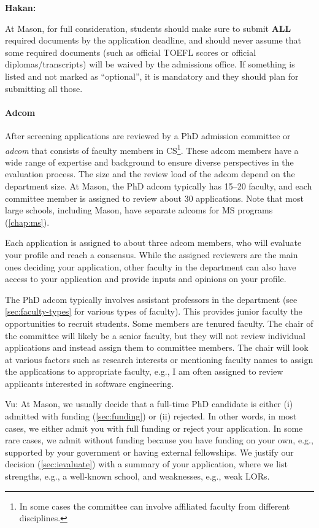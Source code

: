 \documentclass[oneside,11pt,dvipsnames]{book}
\newenvironment{commentbox}[1][]{
  \small
  \begin{mybox}
    {\small \textbf{#1}}
  }{
  \end{mybox}
}
\begin{document}
\begin{commentbox}[Hakan:]
  At Mason, for full consideration, students should make sure to submit \textbf{ALL} required documents by the application deadline, and should never assume that some required documents (such as official TOEFL scores or official diplomas/transcripts) will be waived by the admissions office. If something is listed and not marked as ``optional'', it is mandatory and they should plan for submitting all those.
\end{commentbox}

\paragraph{Adcom} After screening applications are reviewed by a PhD admission committee or \emph{adcom} that consists of faculty members in CS\footnote{In some cases the committee can involve affiliated faculty from different disciplines.}. These adcom members have a wide range of expertise and background to ensure diverse perspectives in the evaluation process. The size and the review load of the adcom depend on the department size. At Mason, the PhD adcom typically has 15--20 faculty, and each committee member is assigned to review about 30 applications. Note that most large schools, including Mason, have separate adcoms for MS programs (\autoref{chap:ms}).

Each application is assigned to about three adcom members, who will evaluate your profile and reach a consensus.  While the assigned reviewers are the main ones deciding your application, other faculty in the department can also have access to your application and provide inputs and opinions on your profile.

The PhD adcom typically involves assistant professors in the department (see \autoref{sec:faculty-types} for various types of faculty). This provides junior faculty the opportunities to recruit students. Some members are tenured faculty. The chair of the committee will likely be a senior faculty, but they will not review individual applications and instead assign them to committee members. The chair will look at various factors such as research interests or mentioning faculty names to assign the applications to appropriate faculty, e.g., I am often assigned to review applicants interested in software engineering.

\begin{commentbox}{Vu:}
At Mason, we usually decide that a full-time PhD candidate is either (i) admitted with funding (\autoref{sec:funding}) or (ii) rejected. In other words, in most cases, we either
admit you with full funding or reject your application. In some rare cases, we admit
without funding because you have funding on your own, e.g.,
supported by your government or having external fellowships. We justify
our decision (\autoref{sec:ievaluate}) with a summary of your application, where we list
strengths, e.g., a well-known school, and weaknesses, e.g., weak
LORs.
\end{commentbox}
\end{document}
